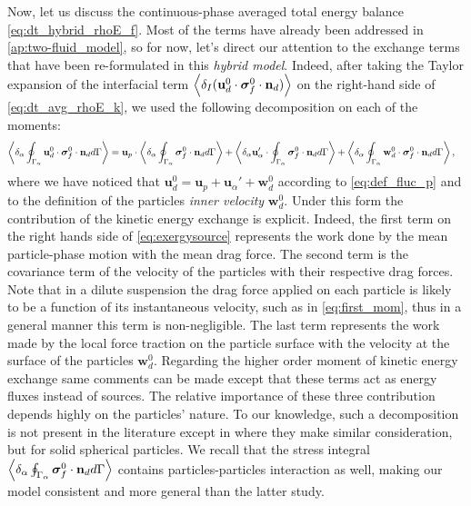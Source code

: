 Now, let us discuss the continuous-phase averaged total energy balance \eqref{eq:dt_hybrid_rhoE_f}. 
Most of the terms have already been addressed in \ref{ap:two-fluid_model}, so for now, let's direct our attention to the exchange terms that have been re-formulated in this \textit{hybrid model}. 
Indeed, after taking the Taylor expansion of the interfacial term $\left<\delta_I (\textbf{u}^0_d \cdot \bm{\sigma}_f^0 \cdot \textbf{n}_d)\right>$ on the right-hand side of \ref{eq:dt_avg_rhoE_k}, we used the following decomposition on each of the moments:
\begin{align}
    \label{eq:exergysource}
    \left<\delta_\alpha  \oint_{\Gamma_{\alpha}} \textbf{u}^0_d \cdot \bm{\sigma}_f^0 \cdot \textbf{n}_d d\Gamma\right>
    &= 
    \textbf{u}_p \cdot \left<\delta_\alpha \oint_{\Gamma_{\alpha}} {\bm{\sigma}_f^0 \cdot \textbf{n}_d} d\Gamma\right>
    + \left<\delta_\alpha  \textbf{u}_\alpha' \cdot \oint_{\Gamma_{\alpha}}   \bm{\sigma}_f^0 \cdot \textbf{n}_d d\Gamma\right>
    + \left<\delta_\alpha  \oint_{\Gamma_{\alpha}} \textbf{w}_d^0 \cdot \bm{\sigma}_f^0 \cdot \textbf{n}_d d\Gamma\right>,
\end{align}
where we have noticed that $\textbf{u}_d^0 = \textbf{u}_p + \textbf{u}_\alpha' +\textbf{w}_d^0$ according to \ref{eq:def_fluc_p} and to the definition of the particles \textit{inner velocity} $\textbf{w}_d^0$. 
Under this form the contribution of the kinetic energy exchange is explicit. 
Indeed, the first term on the right hands side of \ref{eq:exergysource} represents the work done by the mean particle-phase motion with the mean drag force.
The second term is the covariance term of the velocity of the particles with their respective drag forces.
Note that in a dilute suspension the drag force applied on each particle is likely to be a function of its instantaneous velocity, such as in \ref{eq:first_mom}, thus in a general manner this term is non-negligible. 
The last term represents the work made by the local force traction on the particle surface with the velocity at the surface of the particles $\textbf{w}_d^0$.
Regarding the higher order moment of kinetic energy exchange same comments can be made except that these terms act as energy fluxes instead of sources. 
The relative importance of these three contribution depends highly on the particles' nature. 
To our knowledge, such a decomposition is not present in the literature except in \citep[Chapter 2]{scorsim2021particle} where they make similar consideration, but for solid spherical particles.
We recall that the stress integral $\left<\delta_\alpha \oint_{\Gamma_{\alpha}} \bm{\sigma}_f^0 \cdot \textbf{n}_d d\Gamma\right>$ contains particles-particles interaction as well, making our model consistent and more general than the latter study.

